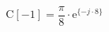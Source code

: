 \begin{center}
\[
\textrm{C}[-1] = \frac{\pi}{8} \cdot \textrm{e}^{\{ -j \cdot 8 \}}
\]
\end{center}

